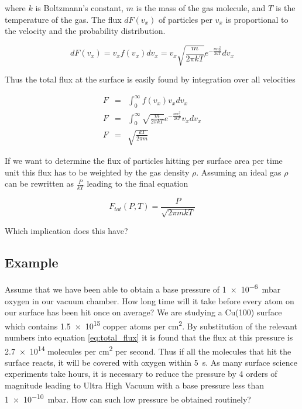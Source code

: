 where $k$ is Boltzmann's constant, $m$ is the mass of the gas molecule, and $T$ is the temperature of the gas. The flux $dF(v_x)$ of particles per $v_x$ is proportional to the velocity and the probability distribution.

\begin{equation}
dF(v_x) = v_xf(v_x)dv_x = v_x\sqrt{\frac{m}{2 \pi kT}}e^{-\frac{mv_x^2}{2kT}}dv_x
\end{equation}

Thus the total flux at the surface is easily found by integration over all velocities

\begin{eqnarray}
F &=& \int_{0}^{\infty}f(v_x)v_xdv_x \\
F &=& \int_{0}^{\infty} \sqrt{\frac{m}{2 \pi kT}}e^{-\frac{mv_x^2}{2kT}}v_xdv_x \\
F &=& \sqrt{\frac{kT}{2\pi m}}
\end{eqnarray}

If we want to determine the flux of particles hitting per surface area per time unit this flux has to be weighted by the gas density $\rho$. Assuming an ideal gas $\rho$ can be rewritten as $\frac{P}{kT}$ leading to the final equation

\begin{equation}
F_{tot}(P,T) = \frac{P}{\sqrt{2 \pi mkT}}
\label{eq:total_flux}
\end{equation}

Which implication does this have?

\subsection{Example}
Assume that we have been able to obtain a base pressure of \SI{1e-6}{mbar} oxygen in our vacuum chamber. How long time will it take before every atom on our surface has been hit once on average? We are studying a Cu(100) surface which contains \num{1.5e15} copper atoms per \si{cm^2}. By substitution of the relevant numbers into equation \eqref{eq:total_flux} it is found that the flux at this pressure is \num{2.7e14}  molecules per \si{cm^2} per second. Thus if all the molecules that hit the surface reacts, it will be covered with oxygen within \SI{5}{\second}. As many surface science experiments take hours, it is necessary to reduce the pressure by 4 orders of magnitude leading to Ultra High Vacuum with a base pressure less than \SI{1e-10}{mbar}. How can such low pressure be obtained routinely?


